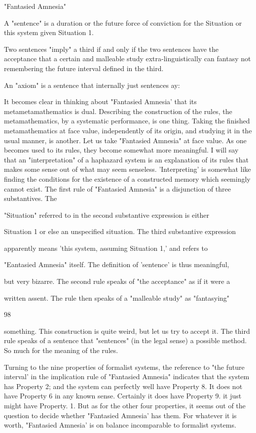\documentclass[10pt,twoside]{memoir}
\begin{document}
\begin{enumerate}
{{{{{{{{{{{{{{{{{{"Fantasied Amnesia" 

A "sentence" is a duration or the future force of conviction for the Situation 
or this system given Situation 1. 

Two sentences "imply" a third if and only if the two sentences have the 
acceptance that a certain and malleable study extra-linguistically can 
fantasy not remembering the future interval defined in the third. 

An "axiom" is a sentence that internally just sentences ay: 

It becomes clear in thinking about "Fantasied Amnesia' that its 
metametamathematics is dual. Describing the construction of the rules, the 
metamathematics, by a systematic performance, is one thing. Taking the 
finished metamathematics at face value, independently of its origin, and 
studying it in the usual manner, is another. Let us take "Fantasied Amnesia" 
at face value. As one becomes used to its rules, they become somewhat more 
meaningful. I will say that an "interpretation" of a haphazard system is an 
explanation of its rules that makes some sense out of what may seem 
senseless. 'Interpreting' is somewhat like finding the conditions for the 
existence of a constructed memory which seemingly cannot exist. The first 
rule of "Fantasied Amnesia" is a disjunction of three substantives. The 

"Situation" referred to in the second substantive expression is either 

Situation 1 or else an unspecified situation. The third substantive expression 

apparently means 'this system, assuming Situation 1,' and refers to 

"Eantasied Amnesia" itself. The definition of 'sentence' is thus meaningful, 

but very bizarre. The second rule speaks of "the acceptance" as if it were a 

written assent. The rule then speaks of a "malleable study" as "fantasying" 


98 


something. This construction is quite weird, but let us try to accept it. The 
third rule speaks of a sentence that "sentences" (in the legal sense) a possible 
method. So much for the meaning of the rules. 


Turning to the nine properties of formalist systems, the reference to 
"the future interval' in the implication rule of "Fantasied Amnesia" 
indicates that the system has Property 2; and the system can perfectly well 
have Property 8. It does not have Property 6 in any known sense. Certainly 
it does have Property 9. it just might have Property. 1. But as for the other 
four properties, it seems out of the question to decide whether "Fantasied 
Amnesia' has them. For whatever it is worth, "Fantasied Amnesia' is on 
balance incomparable to formalist systems. 

}}}}}}}}}}}}}}}}}}
\end{enumerate}
\end{document}
